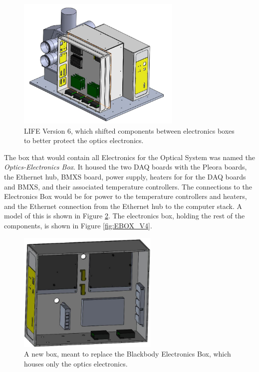 \begin{figure} %
    \centering
    \includegraphics[width=0.7\textwidth]{chap3_images/LIFE_V6_images/LIFE_V6_img2.JPG}
    \caption{LIFE Version 6, which shifted components between electronics boxes to better protect the optics electronics.}
    \label{fig:LIFE_V6}
\end{figure}

The box that would contain all Electronics for the Optical System was named the \textit{Optics-Electronics Box}. It housed the two DAQ boards with the Pleora boards, the Ethernet hub, BMXS board, power supply, heaters for for the DAQ boards and BMXS, and their associated temperature controllers. The connections to the Electronics Box would be for power to the temperature controllers and heaters, and the Ethernet connection from the Ethernet hub to the computer stack. A model of this is shown in Figure \ref{fig:OPTOEBOX_V1}. The electronics box, holding the rest of the components, is shown in Figure \ref{fig:EBOX_V4}.

\begin{figure}
    \centering
    \includegraphics[width=0.6\textwidth]{chap3_images/LIFE_V6_images/optoebox_V1.JPG}
    \caption{A new box, meant to replace the Blackbody Electronics Box, which houses only the optics electronics.}
    \label{fig:OPTOEBOX_V1}
\end{figure}

